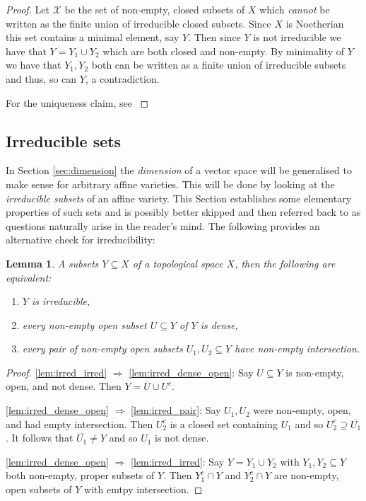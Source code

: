 \documentclass[12pt]{article}
\theoremstyle{plain}
\newtheorem{lemma}[thm]{Lemma}
\theoremstyle{definition}
\newcommand{\scr}[1]{\mathscr{#1}}
\begin{document}
\begin{proof}
Let $\scr{X}$ be the set of non-empty, closed subsets of $X$ which \emph{cannot} be written as the finite union of irreducible closed subsets. Since $X$ is Noetherian this set contains a minimal element, say $Y$. Then since $Y$ is not irreducible we have that $Y = Y_1 \cup Y_2$ which are both closed and non-empty. By minimality of $Y$ we have that $Y_1,Y_2$ both can be written as a finite union of irreducible subsets and thus, so can $Y$, a contradiction.

For the uniqueness claim, see \cite[\S I 1.5]{hartshorne}
\end{proof}
%
%
%
\subsection{Irreducible sets}\label{sec:irreducible}
In Section \ref{sec:dimension} the \emph{dimension} of a vector space will be generalised to make sense for arbitrary affine varieties. This will be done by looking at the \emph{irreducible subsets} of an affine variety. This Section establishes some elementary properties of such sets and is possibly better skipped and then referred back to as questions naturally arise in the reader's mind. The following provides an alternative check for irreducibility:
\begin{lemma}\label{lem:irred_criterion}
A subsets $Y \subseteq X$ of a topological space $X$, then the following are equivalent:
\begin{enumerate}
    \item\label{lem:irred_irred} $Y$ is irreducible,
    \item\label{lem:irred_dense_open} every non-empty open subset $U \subseteq Y$ of $Y$ is dense,
    \item\label{lem:irred_pair} every pair of non-empty open subsets $U_1,U_2 \subseteq Y$ have non-empty intersection.
\end{enumerate}
\end{lemma}
\begin{proof}
\ref{lem:irred_irred} $\Rightarrow$ \ref{lem:irred_dense_open}: Say $U \subseteq Y$ is non-empty, open, and not dense. Then $Y = \overline{U} \cup U^c$.

\ref{lem:irred_dense_open} $\Rightarrow$ \ref{lem:irred_pair}: Say $U_1,U_2$ were non-empty, open, and had empty intersection. Then $U_2^c$ is a closed set containing $U_1$ and so $U_2^c \supseteq \overline{U_1}$. It follows that $\overline{U_1} \neq Y$ and so $U_1$ is not dense.

\ref{lem:irred_dense_open} $\Rightarrow$ \ref{lem:irred_irred}: Say $Y = Y_1 \cup Y_2$ with $Y_1,Y_2 \subseteq Y$ both non-empty, proper subsets of $Y$. Then $Y_1^c \cap Y$ and $Y_2^c \cap Y$ are non-empty, open subsets of $Y$ with emtpy intersection.
\end{proof}
\end{document}
